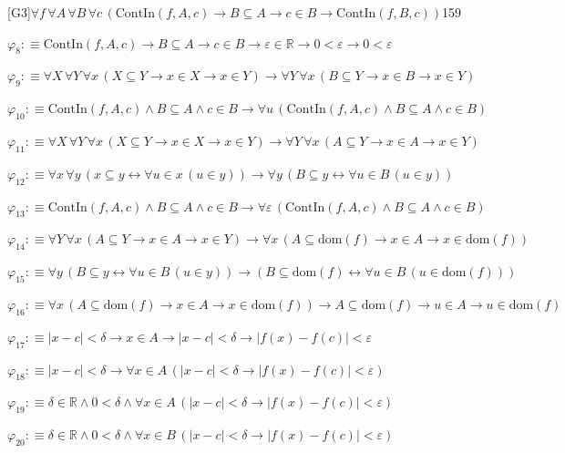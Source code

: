 \begin{fullproof}{[G3]}{$\forall f\,\forall A\,\forall B\,\forall c\,(\mathrm{ContIn}(f,A,c) \to B \subseteq A \to c \in B \to \mathrm{ContIn}(f,B,c))$}{159}
\begin{abbrevlist}
\item $\varphi_{8} :\equiv \mathrm{ContIn}(f,A,c) \to B \subseteq A \to c \in B \to \varepsilon \in \mathbb{R} \to 0 < \varepsilon \to 0 < \varepsilon$
\item $\varphi_{9} :\equiv \forall X\,\forall Y\,\forall x\,(X \subseteq Y \to x \in X \to x \in Y) \to \forall Y\,\forall x\,(B \subseteq Y \to x \in B \to x \in Y)$
\item $\varphi_{10} :\equiv \mathrm{ContIn}(f,A,c) \land B \subseteq A \land c \in B \to \forall u\,(\mathrm{ContIn}(f,A,c) \land B \subseteq A \land c \in B)$
\item $\varphi_{11} :\equiv \forall X\,\forall Y\,\forall x\,(X \subseteq Y \to x \in X \to x \in Y) \to \forall Y\,\forall x\,(A \subseteq Y \to x \in A \to x \in Y)$
\item $\varphi_{12} :\equiv \forall x\,\forall y\,(x \subseteq y \leftrightarrow \forall u \in x\,(u \in y)) \to \forall y\,(B \subseteq y \leftrightarrow \forall u \in B\,(u \in y))$
\item $\varphi_{13} :\equiv \mathrm{ContIn}(f,A,c) \land B \subseteq A \land c \in B \to \forall \varepsilon\,(\mathrm{ContIn}(f,A,c) \land B \subseteq A \land c \in B)$
\item $\varphi_{14} :\equiv \forall Y\,\forall x\,(A \subseteq Y \to x \in A \to x \in Y) \to \forall x\,(A \subseteq \mathrm{dom}(f) \to x \in A \to x \in \mathrm{dom}(f))$
\item $\varphi_{15} :\equiv \forall y\,(B \subseteq y \leftrightarrow \forall u \in B\,(u \in y)) \to (B \subseteq \mathrm{dom}(f) \leftrightarrow \forall u \in B\,(u \in \mathrm{dom}(f)))$
\item $\varphi_{16} :\equiv \forall x\,(A \subseteq \mathrm{dom}(f) \to x \in A \to x \in \mathrm{dom}(f)) \to A \subseteq \mathrm{dom}(f) \to u \in A \to u \in \mathrm{dom}(f)$
\item $\varphi_{17} :\equiv \lvert x - c \rvert < \delta \to x \in A \to \lvert x - c \rvert < \delta \to \lvert f(x) - f(c) \rvert < \varepsilon$
\item $\varphi_{18} :\equiv \lvert x - c \rvert < \delta \to \forall x \in A\,(\lvert x - c \rvert < \delta \to \lvert f(x) - f(c) \rvert < \varepsilon)$
\item $\varphi_{19} :\equiv \delta \in \mathbb{R} \land 0 < \delta \land \forall x \in A\,(\lvert x - c \rvert < \delta \to \lvert f(x) - f(c) \rvert < \varepsilon)$
\item $\varphi_{20} :\equiv \delta \in \mathbb{R} \land 0 < \delta \land \forall x \in B\,(\lvert x - c \rvert < \delta \to \lvert f(x) - f(c) \rvert < \varepsilon)$

\end{abbrevlist}
\end{fullproof}
